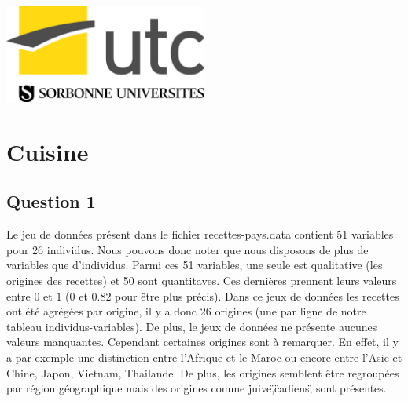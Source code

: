 \documentclass[a4paper,11pt,oneside,roman]{article}
\begin{document}
\begin{titlepage}
        
        \includegraphics[width=0.5\textwidth]{imgs/logo_UTC_SU.jpg}\\[1cm] %
        
    
        \vfill %
        
    \end{titlepage}
    
    
    \pagebreak
        
    \section{Cuisine}
    \subsection*{Question 1}
    Le jeu de données présent dans le fichier recettes-pays.data contient 51 variables pour 26 individus.
    Nous pouvons donc noter que nous disposons de plus de variables que d'individus.
    Parmi ces 51 variables, une seule est qualitative (les origines des recettes) et 50 sont quantitaves.
    Ces dernières prennent leurs valeurs entre $0$ et $1$ ($0$ et $0.82$ pour être plus précis).
    Dans ce jeux de données les recettes ont été agrégées par origine, il y a donc 26 origines (une par ligne de notre tableau individus-variables).
    De plus, le jeux de données ne présente aucunes valeurs manquantes.
    Cependant certaines origines sont à remarquer.
    En effet, il y a par exemple une distinction entre l'Afrique et le Maroc ou encore entre l'Asie et Chine, Japon, Vietnam, Thailande.
    De plus, les origines semblent être regroupées par région géographique mais des origines comme \"juive\",\"cadiens\", sont présentes.
\end{document}

